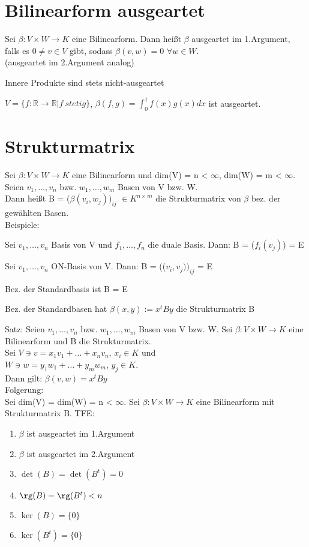 \section{Bilinearform ausgeartet}
Sei $\beta: V \times W \to K$ eine Bilinearform. Dann heißt $\beta$ ausgeartet im 1.Argument, falls es $0 \neq v \in V$ gibt, sodass $\beta(v,w) = 0$ $\forall w \in W$.\\
(ausgeartet im 2.Argument analog)


\begin{remark}
\begin{compactitem}
\item Innere Produkte sind stets nicht-ausgeartet
\item $V = \{ f: \mathbb{R} \to \mathbb{R} | f~stetig \}$, $\beta(f,g) = \displaystyle\int_0^1 f(x) g(x) dx$ ist ausgeartet.
\end{compactitem}
\end{remark}

\section{Strukturmatrix}
Sei $\beta: V \times W \to K$ eine Bilinearform und dim(V) = n < $\infty$, dim(W) = m < $\infty$. Seien $v_1, …, v_n$ bzw. $w_1, …, w_m$ Basen von V bzw. W.\\
Dann heißt B = ($\beta(v_i, w_j))_{ij}$ $\in K^{n \times m}$ die Strukturmatrix von $\beta$ bez. der gewählten Basen.\\
Beispiele:
\begin{compactitem}
\item Sei $v_1, …, v_n$ Basis von V und $f_1, …, f_n$ die duale Basis. Dann: B = ($f_i(v_j)$) = E
\item Sei $v_1, …, v_n$ ON-Basis von V. Dann: B = (($v_i, v_j))_{ij}$ = E
\item Bez. der Standardbasis ist B = E
\item Bez. der Standardbasen hat $\beta(x,y) := x^tBy$ die Strukturmatrix B
\end{compactitem}
Satz: Seien $v_1, …, v_n$ bzw. $w_1, …, w_m$ Basen von V bzw. W. Sei $\beta: V \times W \to K$ eine Bilinearform und B die Strukturmatrix.\\
Sei $V \ni v = x_1v_1 + … + x_nv_n$, $x_i \in K$ und\\
\hspace*{4mm} $W \ni w = y_1w_1 + … + y_mw_m$, $y_j \in K$.\\
Dann gilt: $\beta(v, w) = x^tBy$\\
Folgerung:\\
Sei dim(V) = dim(W) = n < $\infty$. Sei $\beta: V \times W \to K$ eine Bilinearform mit Strukturmatrix B. TFE:
\begin{enumerate}
\item $\beta$ ist ausgeartet im 1.Argument
\item $\beta$ ist ausgeartet im 2.Argument
\item $\det(B) = \det(B^t) = 0$
\item $\rg(B) = \rg(B^t) < n$
\item $\ker(B) = \{0\}$
\item $\ker(B^t) = \{0\}$
\end{enumerate}
